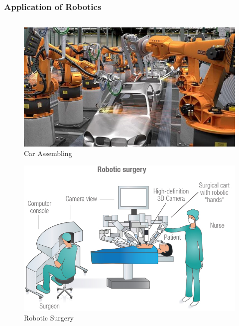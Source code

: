 \documentclass{beamer}
\begin{document}
\begin{frame}
    \frametitle{Application of Robotics}
    \begin{columns}[t]
        \begin{column}{.5\textwidth}
            \begin{figure}[H]
                \centering
                \includegraphics[width=\linewidth, height=.25\textheight, keepaspectratio]{../images/industral-robos.jpg}
                \caption[Boston dynamics robot (spot)]{Car Assembling}
            \end{figure}
            \begin{figure}[H]
                \centering
                \includegraphics[width=\linewidth, height=.25\textheight, keepaspectratio]{../images/robotic-surgery-illustration.jpg}
                \caption[Boston dynamics robot (spot)]{Robotic Surgery}
            \end{figure}
        \end{column}


\end{columns}
\end{frame}
\end{document}
